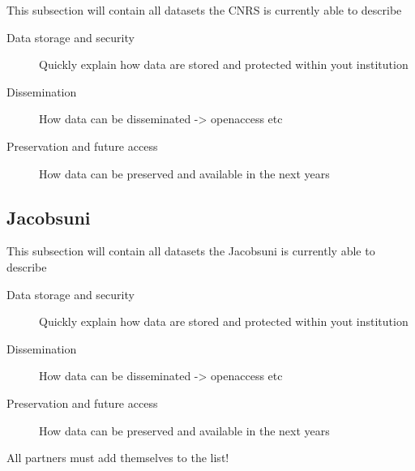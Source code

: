\documentclass[12pt]{amsbook}
\begin{document}
This subsection will contain all datasets the CNRS is currently able to describe
\begin{description}
\item[Data storage and security] Quickly explain how data are stored and protected within yout institution
\item[Dissemination] How data can be disseminated -> openaccess etc
\item[Preservation and future access] How data can be preserved and available in the next years
\end{description}


\subsection{Jacobsuni}



This subsection will contain all datasets the Jacobsuni is currently able to describe
\begin{description}
\item[Data storage and security] Quickly explain how data are stored and protected within yout institution
\item[Dissemination] How data can be disseminated -> openaccess etc
\item[Preservation and future access] How data can be preserved and available in the next years
\end{description}

All partners must add themselves to the list!
\end{document}
